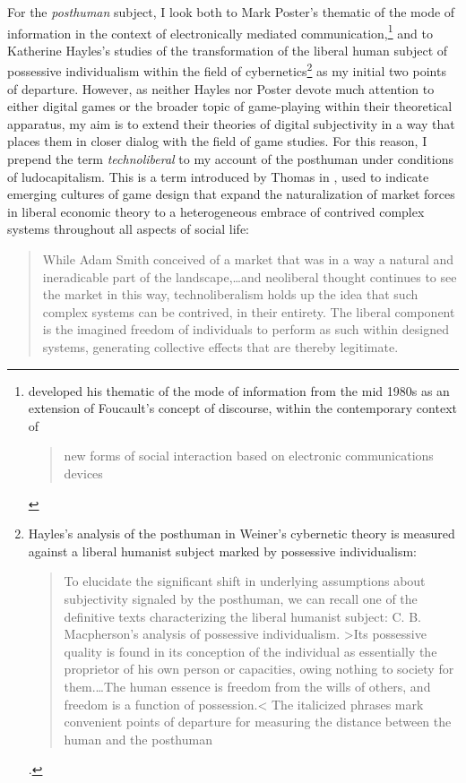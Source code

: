 For the \emph{posthuman} subject, I look both to Mark Poster's thematic of the mode of
information in the context of electronically mediated communication,\footnote{
	\citeauthor{Poster1984} developed his thematic of the mode of information from the mid 1980s as
	an extension of Foucault's concept of discourse, within the contemporary context
	of \blockcquote[168]{Poster1984}{new forms of social interaction based on
		electronic communications devices}.
} and to Katherine Hayles's studies of the transformation of the liberal human subject of
possessive individualism within the field of cybernetics\footnote{
	Hayles's analysis of the posthuman in Weiner's cybernetic theory is measured
	against a liberal humanist subject marked by possessive individualism:\blockquote{To elucidate the significant shift in underlying
		assumptions about subjectivity signaled by the posthuman, we can recall one of
		the definitive texts characterizing the liberal humanist subject: C. B.
		Macpherson's analysis of possessive individualism. >Its possessive quality is
		found in its conception of the individual as essentially the proprietor of his
		own person or capacities, owing nothing to society for them.…The
		human essence is freedom from the wills of others, and freedom is a function of
		possession.< The italicized phrases mark convenient points of departure for
		measuring the distance between the human and the posthuman}\autocite*[3]{Hayles1999-de}.}
as my initial two points of departure. However, as neither Hayles nor Poster
devote much attention to either digital games or the broader topic of
game-playing within their theoretical apparatus, my aim is to extend their
theories of digital subjectivity in a way that places them in closer dialog
with the field of game studies. For this reason, I prepend the term
\emph{technoliberal} to my account of the posthuman under conditions of
ludocapitalism. This is a term introduced by Thomas \citeauthor{Malaby2011-my} in , used to indicate emerging
cultures of game design that expand the naturalization of market forces in
liberal economic theory to a heterogeneous embrace of contrived complex systems
throughout all aspects of social life:
\blockcquote[133]{Malaby2011-my}{While Adam Smith conceived of a market that was
	in a way a natural and ineradicable part of the landscape,…and
	neoliberal thought continues to see the market in this way, technoliberalism
	holds up the idea that such complex systems can be contrived, in their entirety.
	The liberal component is the imagined freedom of individuals to perform as such
	within designed systems, generating collective effects that are thereby
	legitimate.}
